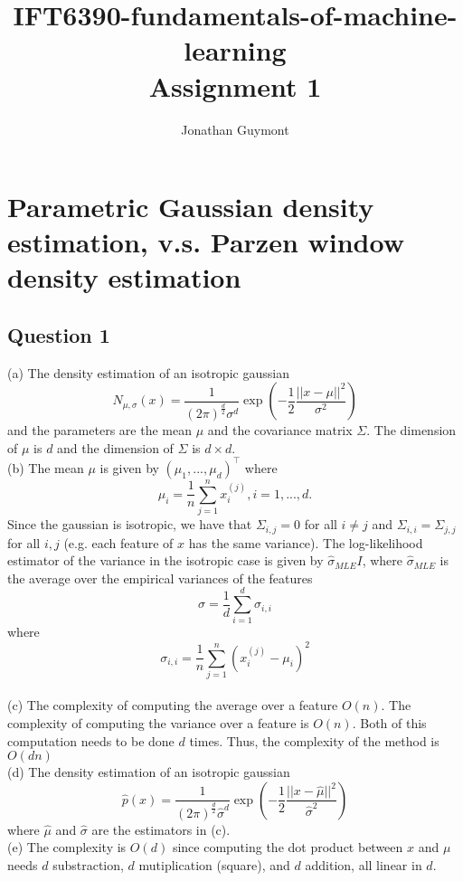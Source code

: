 \documentclass[12pt]{article}
\begin{document}
\title{IFT6390-fundamentals-of-machine-learning\\Assignment 1}
\author{Jonathan Guymont}
\maketitle

\section*{Parametric Gaussian density estimation, v.s. Parzen
window density estimation}

\subsection*{Question 1}
(a) The density estimation of an isotropic gaussian
$$
    N_{\mu, \sigma}(x)
    = \frac{1}{(2\pi)^\frac{d}{2}\sigma^d}
    \exp(-\frac{1}{2}\frac{||x-\mu||^2}{\sigma^2})
$$
and the parameters are the mean $\mu$ and the covariance matrix $\Sigma$. The dimension of $\mu$ is $d$ and the dimension of $\Sigma$ is $d\times d$.\\

(b) The mean $\mu$ is given by $(\mu_1,...,\mu_d)^\top$ where
$$
\mu_i = \frac{1}{n}\sum_{j=1}^n x^{(j)}_i, i=1,...,d. 
$$
Since the gaussian is isotropic, we have that $\Sigma_{i,j}=0$ for all $i\neq j$ and $\Sigma_{i,i}=\Sigma_{j,j}$ for all $i, j$ (e.g. each feature of $x$ has the same variance). The log-likelihood estimator of the variance in the isotropic case is given by $\hat{\sigma}_{MLE} I$, where $\hat{\sigma}_{MLE}$ is the average over the empirical variances of the features
$$
\sigma = \frac{1}{d}\sum_{i=1}^d \sigma_{i, i}
$$
where
$$
\sigma_{i, i} = \frac{1}{n}\sum_{j=1}^n (x^{(j)}_i-\mu_i)^2
$$\\

(c) The complexity of computing the average over a feature $O(n)$. The complexity of computing the variance over a feature is $O(n)$. Both of this computation needs to be done $d$ times. Thus, the complexity of the method is $O(dn)$ \\

(d) The density estimation of an isotropic gaussian
$$
    \hat{p}(x)
    = \frac{1}{(2\pi)^\frac{d}{2}\hat{\sigma}^d}
    \exp(-\frac{1}{2}\frac{||x-\hat{\mu}||^2}{\hat{\sigma}^2})
$$
where $\hat{\mu}$ and $\hat{\sigma}$ are the estimators in (c).\\

(e) The complexity is $O(d)$ since computing the dot product between $x$ and $\mu$ needs $d$ substraction, $d$ mutiplication (square), and $d$ addition, all linear in $d$.
\end{document}
